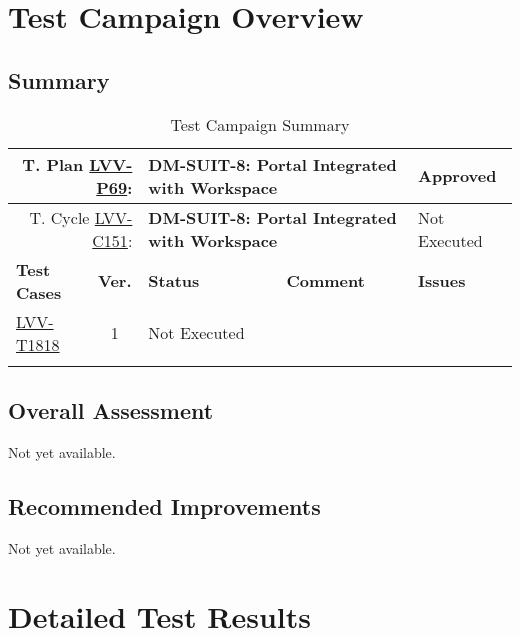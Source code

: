 \documentclass[DM,lsstdraft,STR,toc]{lsstdoc}
\begin{document}
\newpage

\section{Test Campaign Overview}
\label{sect:overview}

\subsection{Summary}
\label{sect:summarytable}

{\small
\begin{longtable}{p{2cm}cp{2.3cm}p{8.6cm}p{2.3cm}}
\toprule
\multicolumn{2}{r}{ T. Plan \href{https://jira.lsstcorp.org/secure/Tests.jspa\#/testPlan/LVV-P69}{LVV-P69}:} &
\multicolumn{2}{p{10.9cm}}{\textbf{ DM-SUIT-8: Portal Integrated with Workspace }} & Approved \\\hline
\multicolumn{2}{r}{ T. Cycle \href{https://jira.lsstcorp.org/secure/Tests.jspa\#/testCycle/LVV-C151}{LVV-C151}:} &
\multicolumn{2}{p{10.9cm}}{\textbf{ DM-SUIT-8: Portal Integrated with Workspace }} & Not Executed \\\hline
\textbf{Test Cases} &  \textbf{Ver.} & \textbf{Status} & \textbf{Comment} & \textbf{Issues} \\\toprule
\href{https://jira.lsstcorp.org/secure/Tests.jspa#/testCase/LVV-T1818}{LVV-T1818}
&  1
& Not Executed &
\begin{minipage}[]{9cm}
\smallskip

\medskip
\end{minipage}
&
\\\hline
\caption{Test Campaign Summary}
\label{table:summary}
\end{longtable}
}

\subsection{Overall Assessment}
\label{sect:overallassessment}

Not yet available.

\subsection{Recommended Improvements}
\label{sect:recommendations}

Not yet available.

\newpage
\section{Detailed Test Results}
\label{sect:detailedtestresults}
\end{document}
